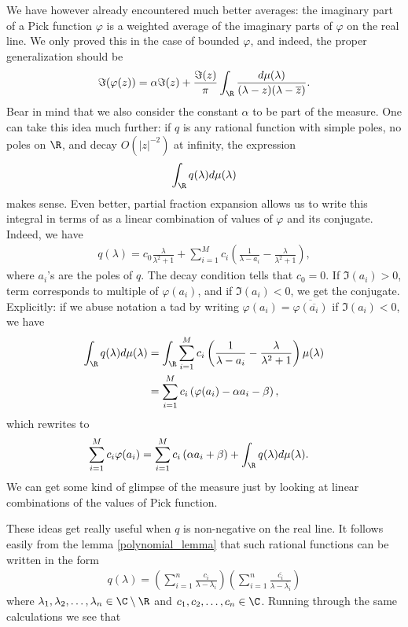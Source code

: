 We have however already encountered much better averages: the imaginary part of a Pick function $\varphi$ is a weighted average of the imaginary parts of $\varphi$ on the real line. We only proved this in the case of bounded $\varphi$, and indeed, the proper generalization should be 
\begin{align*}
	\Im(\varphi(z)) = \alpha \Im(z) + \frac{\Im(z)}{\pi}\int_{\R} \frac{d \mu(\lambda)}{(\lambda - z)(\lambda - \overline{z})}.
\end{align*}
Bear in mind that we also consider the constant $\alpha$ to be part of the measure. One can take this idea much further: if $q$ is any rational function with simple poles, no poles on $\R$, and decay $O(|z|^{-2})$ at infinity, the expression
\begin{align*}
	\int_{\R} q(\lambda) d \mu(\lambda)
\end{align*}
makes sense. Even better, partial fraction expansion allows us to write this integral in terms of as a linear combination of values of $\varphi$ and its conjugate. Indeed, we have
\begin{align*}
	q(\lambda) = c_{0}\frac{\lambda}{\lambda^2 + 1} + \sum_{i = 1}^{M} c_{i} \left(\frac{1}{\lambda - a_{i}} - \frac{\lambda}{\lambda^2 + 1}\right),
\end{align*}
where $a_{i}$'s are the poles of $q$. The decay condition tells that $c_{0} = 0$. If $\Im(a_{i}) > 0$, term corresponds to multiple of $\varphi(a_{i})$, and if $\Im(a_{i}) < 0$, we get the conjugate. Explicitly: if we abuse notation a tad by writing $\varphi(a_{i}) = \overline{\varphi(\overline{a_{i}})}$ if $\Im(a_{i}) < 0$, we have
\begin{align*}
	\int_{\R} q(\lambda) d \mu(\lambda) &= \int_{\R} \sum_{i = 1}^{M} c_{i} \left(\frac{1}{\lambda - a_{i}} - \frac{\lambda}{\lambda^2 + 1}\right)\mu(\lambda) \\
	&= \sum_{i = 1}^{M} c_{i} \left(\varphi(a_{i}) - \alpha a_{i} - \beta\right),
\end{align*}
which rewrites to
\begin{align*}
	\sum_{i = 1}^{M} c_{i} \varphi(a_{i}) &= \sum_{i = 1}^{M} c_{i} \left(\alpha a_{i} + \beta\right) + \int_{\R} q(\lambda) d \mu(\lambda).
\end{align*}
We can get some kind of glimpse of the measure just by looking at linear combinations of the values of Pick function.

These ideas get really useful when $q$ is non-negative on the real line. It follows easily from the lemma \ref{polynomial_lemma} that such rational functions can be written in the form
\begin{align*}
	q(\lambda) = \left( \sum_{i = 1}^{n} \frac{c_{i}}{\lambda - \lambda_{i}}\right) \left(\sum_{i = 1}^{n}\frac{\overline{c_{i}}}{\lambda - \overline{\lambda_{i}}}\right)
\end{align*}
where $\lambda_{1}, \lambda_{2}, \ldots, \lambda_{n} \in \C \setminus \R$ and $c_{1}, c_{2}, \ldots, c_{n} \in \C$. Running through the same calculations we see that

